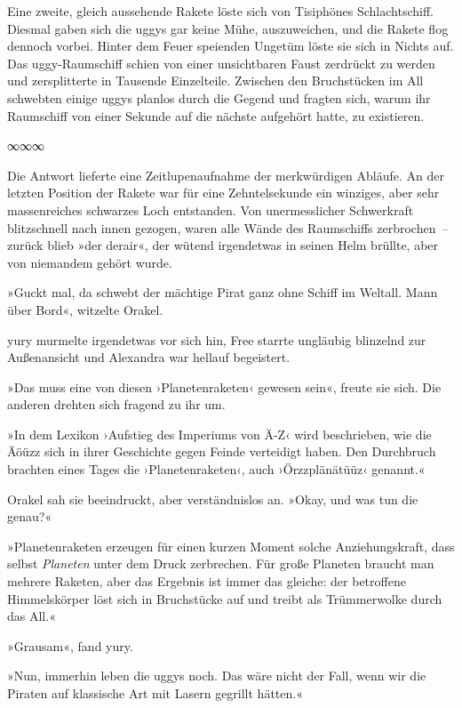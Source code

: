 Eine zweite, gleich aussehende Rakete löste sich von Tisiphönes Schlachtschiff. Diesmal gaben sich die uggys gar keine Mühe, auszuweichen, und die Rakete flog dennoch vorbei. Hinter dem Feuer speienden Ungetüm löste sie sich in Nichts auf. Das uggy-Raumschiff schien von einer unsichtbaren Faust zerdrückt zu werden und zersplitterte in Tausende Einzelteile. Zwischen den Bruchstücken im All schwebten einige uggys planlos durch die Gegend und fragten sich, warum ihr Raumschiff von einer Sekunde auf die nächste aufgehört hatte, zu existieren.

\begin{center}
    ∞∞∞
\end{center}

Die Antwort lieferte eine Zeitlupenaufnahme der merkwürdigen Abläufe. An der letzten Position der Rakete war für eine Zehntelsekunde ein winziges, aber sehr massenreiches schwarzes Loch entstanden. Von unermesslicher Schwerkraft blitzschnell nach innen gezogen, waren alle Wände des Raumschiffs zerbrochen~– zurück blieb »der derair«, der wütend irgendetwas in seinen Helm brüllte, aber von niemandem gehört wurde.

»Guckt mal, da schwebt der mächtige Pirat ganz ohne Schiff im Weltall. Mann über Bord«, witzelte Orakel.

yury murmelte irgendetwas vor sich hin, Free starrte ungläubig blinzelnd zur Außenansicht und Alexandra war hellauf begeistert.

»Das muss eine von diesen ›Planetenraketen‹ gewesen sein«, freute sie sich. Die anderen drehten sich fragend zu ihr um.

»In dem Lexikon ›Aufstieg des Imperiums von Ä-Z‹ wird beschrieben, wie die Äöüzz sich in ihrer Geschichte gegen Feinde verteidigt haben. Den Durchbruch brachten eines Tages die ›Planetenraketen‹, auch ›Örzzplänätüüz‹ genannt.«

Orakel sah sie beeindruckt, aber verständnislos an. »Okay, und was tun die genau?«

»Planetenraketen erzeugen für einen kurzen Moment solche Anziehungskraft, dass selbst \emph{Planeten} unter dem Druck zerbrechen. Für große Planeten braucht man mehrere Raketen, aber das Ergebnis ist immer das gleiche: der betroffene Himmelskörper löst sich in Bruchstücke auf und treibt als Trümmerwolke durch das All.«

»Grausam«, fand yury.

»Nun, immerhin leben die uggys noch. Das wäre nicht der Fall, wenn wir die Piraten auf klassische Art mit Lasern gegrillt hätten.«

